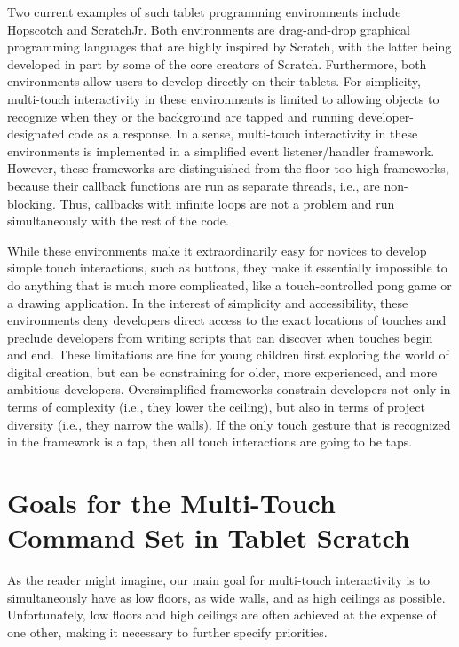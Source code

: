 Two current examples of such tablet programming environments include Hopscotch\cite{Hopscotch} and ScratchJr\cite{ScratchJr}. Both environments are drag-and-drop graphical programming languages that are highly inspired by Scratch, with the latter being developed in part by some of the core creators of Scratch. Furthermore, both environments allow users to develop directly on their tablets. For simplicity, multi-touch interactivity in these environments is limited to allowing objects to recognize when they or the background are tapped and running developer-designated code as a response. In a sense, multi-touch interactivity in these environments is implemented in a simplified event listener/handler framework. However, these frameworks are distinguished from the floor-too-high frameworks, because their callback functions are run as separate threads, i.e., are non-blocking. Thus, callbacks with infinite loops are not a problem and run simultaneously with the rest of the code.

While these environments make it extraordinarily easy for novices to develop simple touch interactions, such as buttons, they make it essentially impossible to do anything that is much more complicated, like a touch-controlled pong game or a drawing application. In the interest of simplicity and accessibility, these environments deny developers direct access to the exact locations of touches and preclude developers from writing scripts that can discover when touches begin and end. These limitations are fine for young children first exploring the world of digital creation, but can be constraining for older, more experienced, and more ambitious developers. Oversimplified frameworks constrain developers not only in terms of complexity (i.e., they lower the ceiling), but also in terms of project diversity (i.e., they narrow the walls). If the only touch gesture that is recognized in the framework is a tap, then all touch interactions are going to be taps.

\section{Goals for the Multi-Touch Command Set in Tablet Scratch}
As the reader might imagine, our main goal for multi-touch interactivity is to simultaneously have as low floors, as wide walls, and as high ceilings as possible. Unfortunately, low floors and high ceilings are often achieved at the expense of one other, making it necessary to further specify priorities. 

